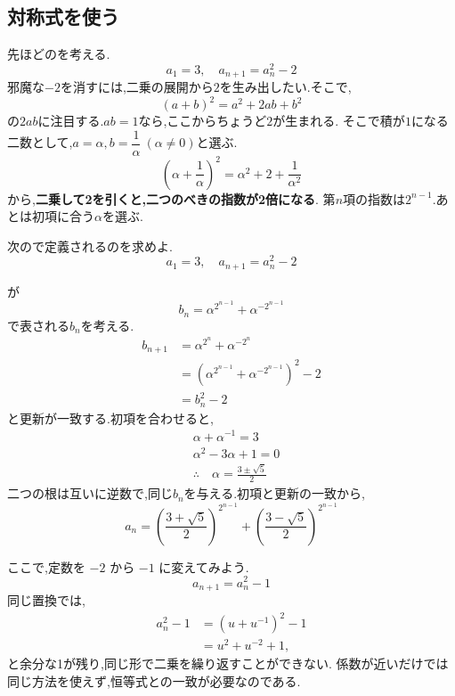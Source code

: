 \subsection{対称式を使う}\label{節：基本対称式型}
先ほどのを考える.
\[
  a_1=3, \quad a_{n+1}=a_n^2-2
\]
邪魔な$-2$を消すには,二乗の展開から$2$を生み出したい.そこで,
\[
  (a+b)^2=a^2+2ab+b^2
\]
の$2ab$に注目する.$ab=1$なら,ここからちょうど$2$が生まれる.
    そこで積が$1$になる二数として,$a=\alpha,b=\dfrac{1}{\alpha}\ (\alpha\ne0)$と選ぶ.
\[
  \left(\alpha+\frac{1}{\alpha}\right)^2=\alpha^2+2+\frac{1}{\alpha^2}
\]
から,\textbf{二乗して2を引くと,二つのべきの指数が2倍になる}.
第$n$項の指数は$2^{n-1}$.あとは初項に合う$\alpha$を選ぶ.

\noindent {}\par\nobreak
\begin{smallquote}
  次ので定義されるのを求めよ.
  \[
    a_1=3, \quad a_{n+1}=a_n^2-2
  \]
\end{smallquote}
  \begin{smallquote}
  が
    \[
      b_n=\alpha^{2^{n-1}}+\alpha^{-2^{n-1}}
    \]
    で表される$b_n$を考える.
    \begin{align*}
      b_{n+1}&=\alpha^{2^{n}}+\alpha^{-2^{n}}\\
      &=\left(\alpha^{2^{n-1}}+\alpha^{-2^{n-1}}\right)^2-2\\
      &=b_n^2-2
    \end{align*}
    と更新が一致する.初項を合わせると,
    \begin{align*}
      &\alpha+\alpha^{-1}=3\\
      &\alpha^2-3\alpha+1=0\\
      &\therefore \quad \alpha=\frac{3\pm \sqrt{5}}{2}
    \end{align*}
    二つの根は互いに逆数で,同じ$b_n$を与える.初項と更新の一致から,
    \[
      a_n=\left(\frac{3+ \sqrt{5}}{2}\right)^{2^{n-1}}+\left(\frac{3- \sqrt{5}}{2}\right)^{2^{n-1}}
    \]
  \end{smallquote}

ここで,定数を $-2$ から $-1$ に変えてみよう.
\[
  a_{n+1}=a_n^2-1
\]
同じ置換では,
\begin{align*}
  a_n^2-1
    &=\left(u+u^{-1}\right)^2-1\\
    &=u^2+u^{-2}+1,
\end{align*}
と余分な1が残り,同じ形で二乗を繰り返すことができない.
係数が近いだけでは同じ方法を使えず,恒等式との一致が必要なのである.

